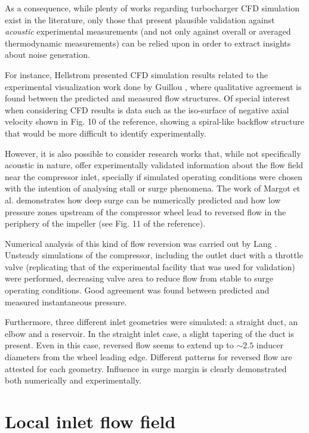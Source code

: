 As a consequence, while plenty of works regarding turbocharger CFD simulation exist in the literature, only those that present plausible validation against \emph{acoustic} experimental measurements (and not only against overall or averaged thermodynamic measurements) can be relied upon in order to extract insights about noise generation.

For instance, Hellstrom \cite{hellstrom2010stall} presented CFD simulation results related to the experimental visualization work done by Guillou \cite{guillou2011flow}, where qualitative agreement is found between the predicted and measured flow structures. Of special interest when considering CFD results is data such as the iso-surface of negative axial velocity shown in Fig. 10 of the reference, showing a spiral-like backflow structure that would be more difficult to identify experimentally.

However, it is also possible to consider research works that, while not specifically acoustic in nature, offer experimentally validated information about the flow field near the compressor inlet, specially if simulated operating conditions were chosen with the intention of analysing stall or surge phenomena. The work of Margot et al. \cite{margot2008combination} demonstrates how deep surge can be numerically predicted and how low pressure zones upstream of the compressor wheel lead to reversed flow in the periphery of the impeller (see Fig. 11 of the reference).

Numerical analysis of this kind of flow reversion was carried out by Lang \cite{lang2011contribucion}. Unsteady simulations of the compressor, including the outlet duct with a throttle valve (replicating that of the experimental facility that was used for validation) were performed, decreasing valve area to reduce flow from stable to surge operating conditions. Good agreement was found between predicted and measured instantaneous pressure. 

Furthermore, three different inlet geometries were simulated: a straight duct, an elbow and a reservoir. In the straight inlet case, a slight tapering of the duct is present. Even in this case, reversed flow seems to extend up to $\sim 2.5$ inducer diameters from the wheel leading edge. Different patterns for reversed flow are attested for each geometry. Influence in surge margin is clearly demonstrated both numerically and experimentally.

\section{Local inlet flow field}
\label{sec:liter_local_flow}

